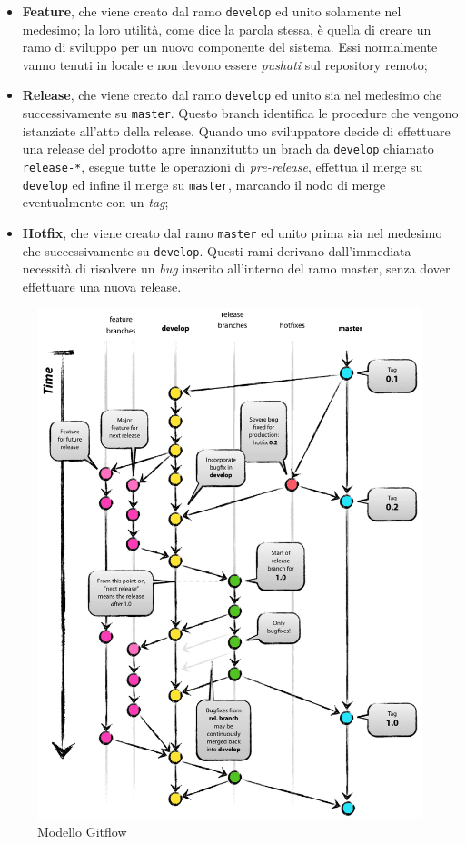 \begin{itemize}

\item \textbf{Feature}, che viene creato dal ramo \texttt{develop} ed unito solamente nel medesimo; la loro utilità, come dice la parola stessa, è quella di creare un ramo di sviluppo per un nuovo componente del sistema. Essi normalmente vanno tenuti in locale e non devono essere \textit{pushati} sul repository remoto;

\item \textbf{Release}, che viene creato dal ramo \texttt{develop} ed unito sia nel medesimo che successivamente su \texttt{master}. Questo branch identifica le procedure che vengono istanziate all'atto della release. Quando uno sviluppatore decide di effettuare una release del prodotto apre innanzitutto un brach da \texttt{develop} chiamato \texttt{release-*}, esegue tutte le operazioni di \textit{pre-release}, effettua il merge su \texttt{develop} ed infine il merge su \texttt{master}, marcando il nodo di merge eventualmente con un \textit{tag};

\item \textbf{Hotfix}, che viene creato dal ramo \texttt{master} ed unito prima sia nel medesimo che successivamente su \texttt{develop}. Questi rami derivano dall'immediata necessità di risolvere un \textit{bug} inserito all'interno del ramo master, senza dover effettuare una nuova release. 

\end{itemize}

\begin{figure}[htpd]
\centering
\includegraphics[width=\textwidth/2]{../immagini/git-flow-model}
\caption{Modello Gitflow}
\end{figure}


